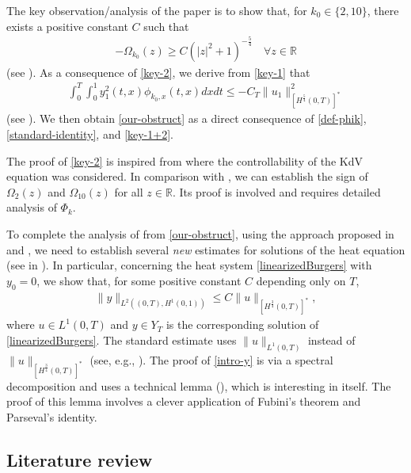 \documentclass[11pt, reqno]{amsart}
\theoremstyle{plain}
\numberwithin{equation}{section}
\newcommand{\mR}{\mathbb{R}}
\begin{document}
The key observation/analysis of the paper is to show that, for $k_0 \in \{2,  10\}$, there exists a positive constant $C$ such that
\begin{align}\label{key-2}
-\Omega_{k_0}(z) \geq C (|z|^2 + 1)^{-\frac{5}{4}} \quad \forall z \in \mR 
\end{align} 
(see ). As a consequence of  \eqref{key-2}, we derive from  \eqref{key-1} that
\begin{align}	\label{key-1+2}
	\int_0^T \int_0^1 y_1^2(t, x) \phi_{k_0, x}(t, x) dx dt \leq - C_T \|u_1\|^2_{[H^{\frac{5}{4}}(0, T)]^*}
\end{align}
(see ). We then obtain \eqref{our-obstruct} as a direct consequence of \eqref{def-phik}, \eqref{standard-identity}, and \eqref{key-1+2}. 

The proof of \eqref{key-2} is inspired from \cite[Theorem 1.3]{Nguyen} where the controllability of the KdV equation was considered. In comparison with \cite{Nguyen}, we can establish the sign of $\Omega_2(z)$ and $\Omega_{10}(z)$ for all $z \in \mR$. Its proof is involved and requires detailed analysis of $\Phi_k$. 
 
To complete the analysis of  from \eqref{our-obstruct}, using the approach proposed in  \cite{Coron-Koenig-Nguyen} and \cite{Nguyen}, we need to establish several {\it new} estimates for solutions of the heat equation (see  in ). In particular, concerning the heat system \eqref{linearizedBurgers} with $y_0 = 0$, we show that, for some positive constant $C$ depending only on $T$,   
\begin{align}		\label{intro-y}
	\|y\|_{L^2((0, T), H^1(0, 1))} \leq C \|u\|_{[H^{\frac{3}{4}}(0, T)]^*},
\end{align}    
where $u \in L^1(0, T)$ and $y \in Y_T$ is the corresponding solution of \eqref{linearizedBurgers}. The standard estimate uses $\| u \|_{L^1(0, T)}$ instead of $\|u\|_{[H^{\frac{3}{4}}(0, T)]^*}$ (see, e.g., ). The proof of  \eqref{intro-y} is via a spectral decomposition and uses a technical lemma (), which is interesting in itself. The proof of this lemma involves a clever application of Fubini's theorem and Parseval's identity.
\subsection{Literature review} 
\end{document}
